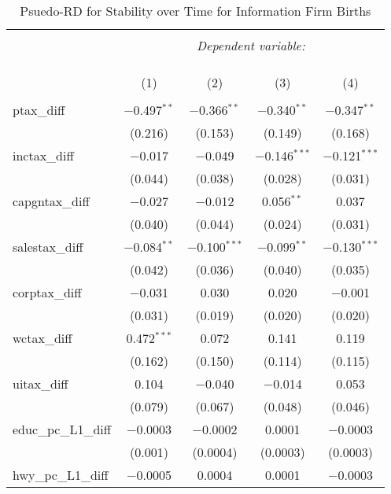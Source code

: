 
\begin{table}[!htbp] \centering 
  \caption{Psuedo-RD for Stability over Time for  Information Firm Births} 
  \label{} 
\begin{tabular}{@{\extracolsep{5pt}}lcccc} 
\\[-1.8ex]\hline 
\hline \\[-1.8ex] 
 & \multicolumn{4}{c}{\textit{Dependent variable:}} \\ 
\cline{2-5} 
\\[-1.8ex] & \multicolumn{4}{c}{ } \\ 
\\[-1.8ex] & (1) & (2) & (3) & (4)\\ 
\hline \\[-1.8ex] 
 ptax\_diff & $-$0.497$^{**}$ & $-$0.366$^{**}$ & $-$0.340$^{**}$ & $-$0.347$^{**}$ \\ 
  & (0.216) & (0.153) & (0.149) & (0.168) \\ 
  inctax\_diff & $-$0.017 & $-$0.049 & $-$0.146$^{***}$ & $-$0.121$^{***}$ \\ 
  & (0.044) & (0.038) & (0.028) & (0.031) \\ 
  capgntax\_diff & $-$0.027 & $-$0.012 & 0.056$^{**}$ & 0.037 \\ 
  & (0.040) & (0.044) & (0.024) & (0.031) \\ 
  salestax\_diff & $-$0.084$^{**}$ & $-$0.100$^{***}$ & $-$0.099$^{**}$ & $-$0.130$^{***}$ \\ 
  & (0.042) & (0.036) & (0.040) & (0.035) \\ 
  corptax\_diff & $-$0.031 & 0.030 & 0.020 & $-$0.001 \\ 
  & (0.031) & (0.019) & (0.020) & (0.020) \\ 
  wctax\_diff & 0.472$^{***}$ & 0.072 & 0.141 & 0.119 \\ 
  & (0.162) & (0.150) & (0.114) & (0.115) \\ 
  uitax\_diff & 0.104 & $-$0.040 & $-$0.014 & 0.053 \\ 
  & (0.079) & (0.067) & (0.048) & (0.046) \\ 
  educ\_pc\_L1\_diff & $-$0.0003 & $-$0.0002 & 0.0001 & $-$0.0003 \\ 
  & (0.001) & (0.0004) & (0.0003) & (0.0003) \\ 
  hwy\_pc\_L1\_diff & $-$0.0005 & 0.0004 & 0.0001 & $-$0.0003 \\ 

\end{tabular}
\end{table}

